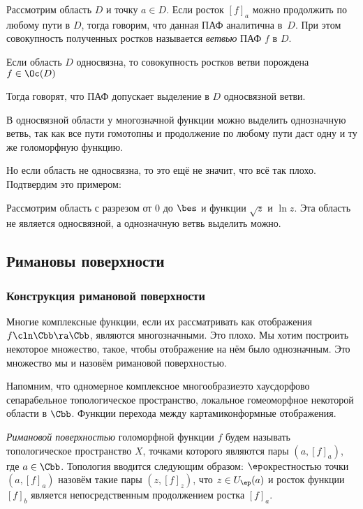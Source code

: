 \documentclass[a4paper]{article}
\begin{document}
\begin{df}
Рассмотрим область $D$ и точку $a\in D$. Если росток $[f]_a$ можно продолжить по любому пути в $D$,
тогда говорим, что данная ПАФ аналитична в~$D$.
При этом совокупность полученных ростков называется \emph{ветвью} ПАФ $f$ в $D$.
\end{df}

\begin{imp}
Если область $D$ односвязна, то совокупность ростков ветви порождена $f\in\Oc(D)$
 \end{imp}
 Тогда говорят, что ПАФ допускает выделение в $D$ односвязной ветви.

\begin{imp}
В односвязной области у многозначной функции можно выделить однозначную ветвь, так как все пути гомотопны
и продолжение по любому пути даст одну и ту же голоморфную функцию.
\end{imp}

Но если область не односвязна, то это ещё не значит, что всё так плохо. Подтвердим это примером:

\begin{ex}
Рассмотрим область с разрезом от $0$ до $\bes$ и функции $\sqrt z$ и $\ln z$.
Эта область не является односвязной, а однозначную ветвь выделить можно.
\end{ex}

\subsection{Римановы поверхности}

\subsubsection{Конструкция римановой поверхности}

Многие комплексные функции, если их рассматривать как отображения $f\cln \Cbb\ra\Cbb$, являются многозначными.
Это плохо. Мы хотим построить некоторое множество, такое, чтобы отображение на нём было однозначным. Это множество
мы и назовём римановой поверхностью.

Напомним, что одномерное комплексное многообразие\т это хаусдорфово сепарабельное топологическое пространство,
локальное гомеоморфное некоторой области в $\Cbb$. Функции перехода между картами\т конформные отображения.

\begin{df}
\emph{Римановой поверхностью} голоморфной функции $f$ будем называть топологическое пространство $X$,
точками которого являются пары $(a, [f]_a)$, где $a \in \Cbb$. Топология вводится следующим образом:
$\ep$\д окрестностью точки $(a, [f]_a)$ назовём такие пары $(z, [f]_z)$, что $z \in U_\ep(a)$ и
росток функции $[f]_b$ является непосредственным продолжением ростка $[f]_a$.
\end{df}
\end{document}
